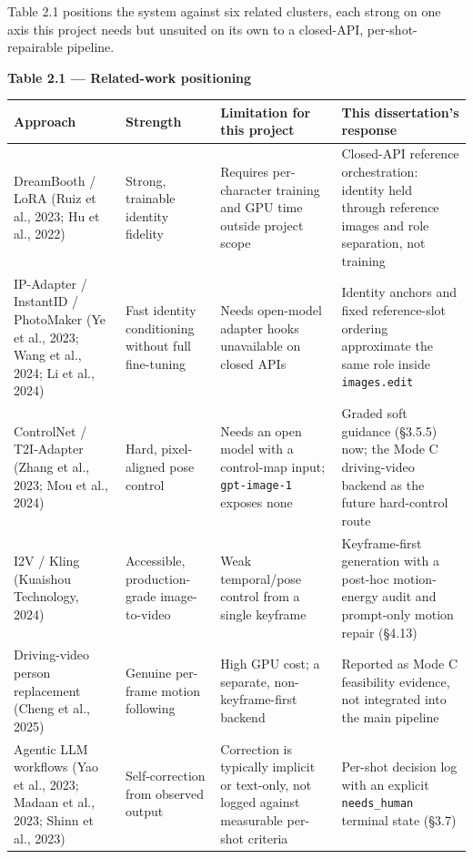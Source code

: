\documentclass[10pt,twocolumn,letterpaper]{article}
\begin{document}
Table 2.1 positions the system against six related clusters, each strong on one axis this project needs but unsuited on its own to a closed-API, per-shot-repairable pipeline.

\begin{table}[t]
\centering
{\footnotesize\textbf{\textbf{Table 2.1 --- Related-work positioning}}}\par\vspace{3pt}
\footnotesize
\begin{tabularx}{\textwidth}{>{\RaggedRight\arraybackslash}X>{\RaggedRight\arraybackslash}X>{\RaggedRight\arraybackslash}X>{\RaggedRight\arraybackslash}X}
\toprule
Approach & Strength & Limitation for this project & This dissertation's response \\
\midrule
DreamBooth / LoRA (Ruiz et al., 2023; Hu et al., 2022) & Strong, trainable identity fidelity & Requires per-character training and GPU time outside project scope & Closed-API reference orchestration: identity held through reference images and role separation, not training \\
IP-Adapter / InstantID / PhotoMaker (Ye et al., 2023; Wang et al., 2024; Li et al., 2024) & Fast identity conditioning without full fine-tuning & Needs open-model adapter hooks unavailable on closed APIs & Identity anchors and fixed reference-slot ordering approximate the same role inside \texttt{images.edit} \\
ControlNet / T2I-Adapter (Zhang et al., 2023; Mou et al., 2024) & Hard, pixel-aligned pose control & Needs an open model with a control-map input; \texttt{gpt-image-1} exposes none & Graded soft guidance (\S{}3.5.5) now; the Mode C driving-video backend as the future hard-control route \\
I2V / Kling (Kuaishou Technology, 2024) & Accessible, production-grade image-to-video & Weak temporal/pose control from a single keyframe & Keyframe-first generation with a post-hoc motion-energy audit and prompt-only motion repair (\S{}4.13) \\
Driving-video person replacement (Cheng et al., 2025) & Genuine per-frame motion following & High GPU cost; a separate, non-keyframe-first backend & Reported as Mode C feasibility evidence, not integrated into the main pipeline \\
Agentic LLM workflows (Yao et al., 2023; Madaan et al., 2023; Shinn et al., 2023) & Self-correction from observed output & Correction is typically implicit or text-only, not logged against measurable per-shot criteria & Per-shot decision log with an explicit \texttt{needs\_human} terminal state (\S{}3.7) \\
\bottomrule
\end{tabularx}
\end{table}
\end{document}
